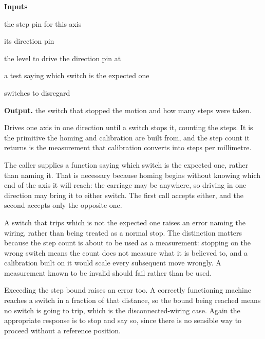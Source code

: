\noindent\textbf{Inputs}
\begin{description}[leftmargin=2.2em,style=nextline,font=\normalfont\ttfamily]\setlength\itemsep{1pt}
  \item[{stepPin}] \normalfont the step pin for this axis
  \item[{dirPin}] \normalfont its direction pin
  \item[{dirValue}] \normalfont the level to drive the direction pin at
  \item[{stopWhen}] \normalfont a test saying which switch is the expected one
  \item[{ignore}] \normalfont switches to disregard
\end{description}

\noindent\textbf{Output.} the switch that stopped the motion and how many steps were taken.


Drives one axis in one direction until a switch stops it, counting the steps. It is the primitive the homing and calibration are built from, and the step count it returns is the measurement that calibration converts into steps per millimetre.


The caller supplies a function saying which switch is the expected one, rather than naming it. That is necessary because homing begins without knowing which end of the axis it will reach: the carriage may be anywhere, so driving in one direction may bring it to either switch. The first call accepts either, and the second accepts only the opposite one.


A switch that trips which is not the expected one raises an error naming the wiring, rather than being treated as a normal stop. The distinction matters because the step count is about to be used as a measurement: stopping on the wrong switch means the count does not measure what it is believed to, and a calibration built on it would scale every subsequent move wrongly. A measurement known to be invalid should fail rather than be used.


Exceeding the step bound raises an error too. A correctly functioning machine reaches a switch in a fraction of that distance, so the bound being reached means no switch is going to trip, which is the disconnected-wiring case. Again the appropriate response is to stop and say so, since there is no sensible way to proceed without a reference position.



